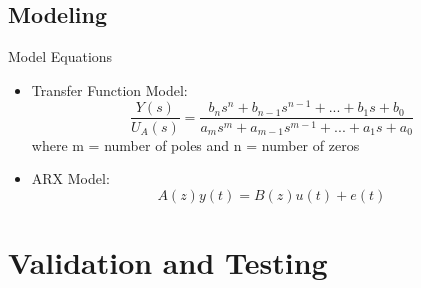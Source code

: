 \documentclass{beamer}
\begin{document}
\subsection{Modeling}

\begin{frame}{Model Equations}
	\begin{block}{}
		\begin{itemize}
			\item Transfer Function Model: 
			\begin{equation}
				\frac{Y(s)}{U_A(s)} = \frac{b_{n}s^{n} + b_{n-1}s^{n-1} + ... + b_1s + b_0}{a_{m}s^{m} + a_{m-1}s^{m-1} + ... + a_1s + a_0}
			\end{equation}
			where m = number of poles and n = number of zeros
			\item ARX Model: 
			\begin{equation}
				A(z)y(t) = B(z)u(t) + e(t)
			\end{equation}
		\end{itemize}
	\end{block}
\end{frame}

\section{Validation and Testing}
\end{document}
